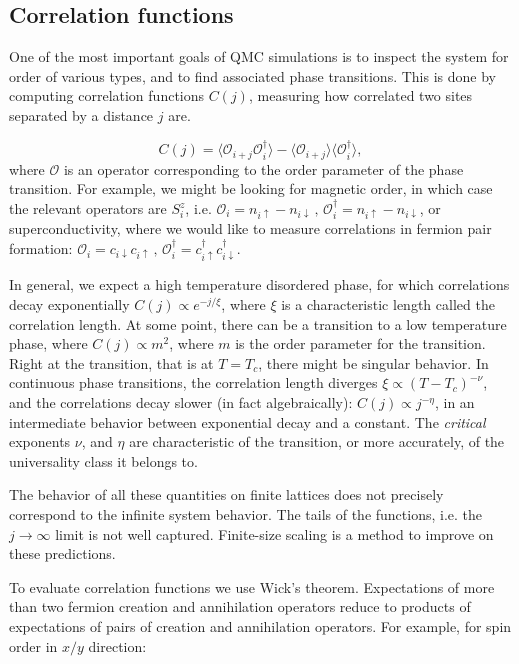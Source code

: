 \subsection{Correlation functions}

One of the most important goals of QMC simulations is to inspect the system for order of various types, and to find  associated phase transitions. This is done by computing correlation functions $C (j) $, measuring how correlated two sites separated by a distance $j$ are.

\begin{equation}
C(j) = \big\langle \mathcal{O}_{i+j} \mathcal{O}_{i}^\dagger \big\rangle - \langle \mathcal{O}_{i+j} \big\rangle\big\langle\mathcal{O}_{i}^\dagger \big\rangle ,
\end{equation}
where $\mathcal{O}$ is an operator corresponding to the order parameter of the phase transition. For example, we might be looking for magnetic order, in which case the relevant operators are $S^z_i$, i.e. $\mathcal{O}_i = n_{i\uparrow} - n_{i\downarrow} \, , \, \mathcal{O}_i^\dagger = n_{i\uparrow} - n_{i\downarrow}$, or superconductivity, where we would like to measure correlations in fermion pair formation: $\mathcal{O}_i = c_{i\downarrow} c_{i\uparrow} \, , \, \mathcal{O}_i^\dagger = c_{i\uparrow}^\dagger c_{i\downarrow}^\dagger$.

In general, we expect a high temperature disordered phase, for which correlations decay exponentially $C(j) \propto e^{-j/\xi}$, where $\xi$ is a characteristic length called the correlation length. At some point, there can be a transition to a low temperature phase, where $C(j) \propto m^2$, where $m$ is the order parameter for the transition. Right at the transition, that is at $T = T_c$, there might be singular behavior. In continuous phase transitions, the correlation length diverges $\xi \propto (T-T_c)^{-\nu}$, and the correlations decay slower (in fact algebraically): $C(j) \propto j^{-\eta}$, in an intermediate behavior between exponential decay and a constant. The \emph{critical} exponents $\nu$, and $\eta$ are characteristic of the transition, or more accurately, of the universality class it belongs to.

The behavior of all these quantities on finite lattices does not precisely correspond to the infinite system behavior. The tails of the functions, i.e. the $j\rightarrow \infty$ limit is not well captured. Finite-size scaling is a method to improve on these predictions.

To evaluate correlation functions we use Wick's theorem. Expectations of more than two fermion creation and annihilation operators reduce to products of expectations of pairs of creation and annihilation operators. For example, for spin order in $x/y$ direction:

